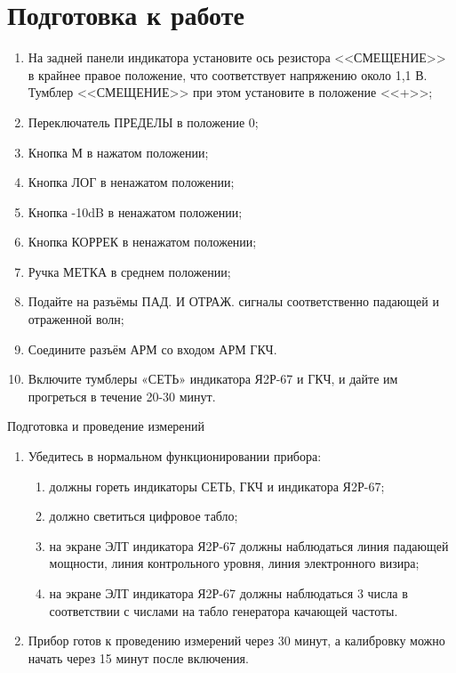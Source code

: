 \documentclass[a4paper]{hedwork}
\begin{document}
    \setcounter{page}{2}
    \tableofcontents
    \section{Подготовка к работе}
        \begin{enumerate}
            \item На задней панели индикатора установите ось резистора
                <<СМЕЩЕНИЕ>> в крайнее правое положение, что соответствует
                напряжению около 1,1 В. Тумблер <<СМЕЩЕНИЕ>> при этом
                установите в положение <<+>>;
            \item Переключатель ПРЕДЕЛЫ в положение 0;
            \item Кнопка М в нажатом положении;
            \item Кнопка ЛОГ в ненажатом положении;
            \item Кнопка -10dB в ненажатом положении;
            \item Кнопка КОРРЕК в ненажатом положении;
            \item Ручка МЕТКА в среднем положении;
            \item Подайте на разъёмы ПАД. И ОТРАЖ. сигналы соответственно
                падающей и отраженной волн;
            \item Соедините разъём АРМ со входом АРМ ГКЧ.
            \item Включите тумблеры «СЕТЬ» индикатора Я2Р-67 и ГКЧ, и дайте им
                прогреться в течение 20-30 минут.
        \end{enumerate}

        Подготовка и проведение измерений
        \begin{enumerate}
            \item Убедитесь в нормальном функционировании прибора:
                \begin{enumerate}
                    \item должны гореть индикаторы СЕТЬ, ГКЧ и индикатора Я2Р-67;
                    \item должно светиться цифровое табло;
                    \item на экране ЭЛТ индикатора Я2Р-67 должны наблюдаться
                        линия падающей мощности, линия контрольного уровня,
                        линия электронного визира;
                    \item на экране ЭЛТ индикатора Я2Р-67 должны наблюдаться
                        3 числа в соответствии с числами на табло генератора
                        качающей частоты.
                \end{enumerate}
            \item Прибор готов к проведению измерений через 30 минут,
                а калибровку можно начать через 15 минут после включения.
        \end{enumerate}
\end{document}
